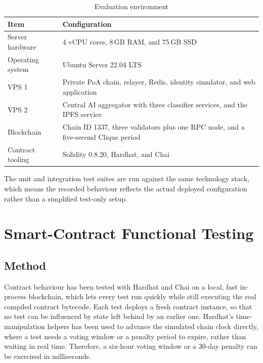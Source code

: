 \begin{table}[htbp]
\centering
\caption{Evaluation environment}
\label{tab:evaluation-environment}
\begin{tabular}{p{}|p{}}
    
    Item & Configuration \\
    \hline
    Server hardware & 4 vCPU cores, 8\,GB RAM, and 75\,GB SSD \\
    \hline
    Operating system & Ubuntu Server 22.04 LTS \\
    \hline
    \ac{VPS} 1 & Private PoA chain, relayer, Redis, identity simulator, and web application \\
    \hline
    \ac{VPS} 2 & Central AI aggregator with three classifier services, and the IPFS service \\
    \hline
    Blockchain & Chain ID 1337, three validators plus one RPC node, and a five-second Clique period \\
    \hline
    Contract tooling & Solidity 0.8.20, Hardhat, and Chai \\
    
\end{tabular}
\end{table}

The unit and integration test suites are run against the same technology stack, which means the recorded behaviour reflects the actual deployed configuration rather than a simplified test-only setup.

\section{Smart-Contract Functional Testing}
\label{sec:contract-testing}

\subsection{Method}

Contract behaviour has been tested with Hardhat and Chai on a local, fast in-process blockchain, which lets every test run quickly while still executing the real compiled contract bytecode. Each test deploys a fresh contract instance, so that no test can be influenced by state left behind by an earlier one. Hardhat's time-manipulation helpers has been used to advance the simulated chain clock directly, where a test needs a voting window or a penalty period to expire, rather than waiting in real time. Therefore, a six-hour voting window or a 30-day penalty can be exercised in milliseconds.

